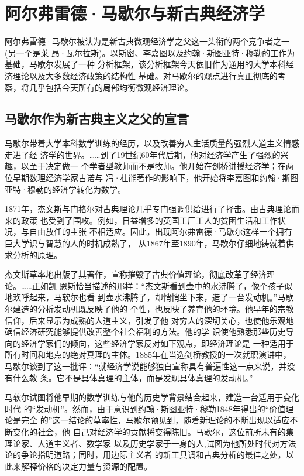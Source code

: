 \chapter{阿尔弗雷德·马歇尔与新古典经济学}

阿尔弗雷德·马歇尔被认为是新古典微观经济学之父这一头衔的两个竞争者之一(另一个是莱
昂·瓦尔拉斯)。以斯密、李嘉图以及约翰·斯图亚特·穆勒的工作为基础，马歇尔发展了一种
分析框架，该分析框架今天依旧作为通用的大学本科经济理论以及大多数经济政策的结构性
基础。对马歇尔的观点进行真正彻底的考察，将几乎包括今天所有的局部均衡微观经济理论。

\section*{马歇尔作为新古典主义之父的宣言}

马歇尔带着大学本科数学训练的经历，以及改善穷人生活质量的强烈人道主义情感走进了经
济学的世界。……到了19世纪60年代后期，他对经济学产生了强烈的兴趣，以至于决定做一
个学者型教师而不是牧师。他开始在剑桥讲授经济学；在两位早期数理经济学家古诺与
冯·杜能著作的影响下，他开始将李嘉图和约翰·斯图亚特·穆勒的经济学转化为数学。

1871年，杰文斯与门格尔对古典理论几乎专门强调供给进行了择击。由古典理论而来的政策
也受到了围攻。例如，日益增多的英国工厂工人的贫困生活和工作状况，与自由放任的主张
不相适应。因此，出现阿尔弗雷德·马歇尔这样一个拥有巨大学识与智慧的人的时机成熟了，
从1867年至1890年，马歇尔仔细地铸就着供求分析的原理。

杰文斯草率地出版了其著作，宣称摧毁了古典价值理论，彻底改革了经济理论。……正如凯
恩斯恰当描述的那样：“杰文斯看到壶中的水沸腾了，像个孩子似地欢呼起来，马软尔也看
到壶水沸腾了，却悄悄坐下来，造了一台发动机。”马歇尔建造的分析发动机既反映了他的
个性，也反映了养育他的环境。他早年的宗教信仰，后来显示为成熟的人道主义，引发了他
对穷人的深切关心，也使他乐观地确信经济研究能够提供改善整个社会福利的方法。他的学
识使他熟悉那些历史导向的经济学家们的倾向，这些经济学家反对如下观点，即经济理论是
一种适用于所有时间和地点的绝对真理的主体。1885年在当选剑桥教授的一次就职演讲中，
马歇尔谈到了这一批评：“就经济学说能够独自宣称具有普遍性这一点来说，并没有什么教
条。它不是具体真理的主体，而是发现具体真理的发动机。”

马软尔试图将他早期的数学训练与他的历史学背景结合起来，建造一台适用于变化时代
的“发动机”。然而，由于意识到约翰·斯图亚特·穆勒1848年得出的“价值理论是完全
的”这一结论的草率性，马歇尔预见到，随着新理论的不断出现以适应不断变化的社会，他
自己对经济学的贡献将变得陈旧。马歇尔，这位前所未有的集理论家、人道主义者、数学家
以及历史学家于一身的人,试图为他所处时代对方法论的争论指明道路；同时，用边际主义者
的新工具调和古典分析的最佳之处，以此来解释价格的决定力量与资源的配置。

